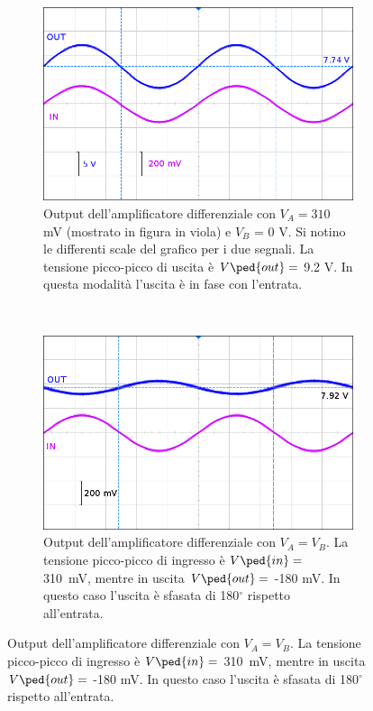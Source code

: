 \begin{figure}[t!]
    \begin{subfigure}[t]{0.48\textwidth}
        \includegraphics[width=\textwidth]{f1.png}
        \caption{Output dell'amplificatore differenziale con $V_A = 310$ mV (mostrato in figura in viola) e $V_B$ = 0 V.
            Si notino le differenti scale del grafico per i due segnali.
            La tensione picco-picco di uscita è $V\ped{out} = $ 9.2 V. In questa modalità l'uscita è in fase con l'entrata.}
        \label{fig:f1}
    \end{subfigure}
    ~
    \begin{subfigure}[t]{0.48\textwidth}
        \includegraphics[width=\textwidth]{f2.png}
        \caption{Output dell'amplificatore differenziale con $V_A = V_B$. La tensione picco-picco di ingresso
        è $V\ped{in} =$ \SI{310}{\milli\volt}, mentre in uscita $V\ped{out} = $ -180 mV. In questo caso l'uscita è sfasata di 180$^\circ$ rispetto all'entrata.}
        \label{fig:f2}

\end{subfigure}
\end{figure}
